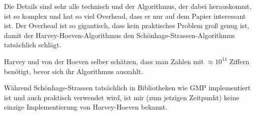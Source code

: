 \begin{remark}
    Die Details sind sehr alle technisch und der Algorithmus, der dabei herauskommt, ist so komplex und hat so viel Overhead, dass er nur auf dem Papier interessant ist. Der Overhead ist so gigantisch, dass kein praktisches Problem groß genug ist, damit der Harvey-Hoeven-Algorithmus den Schönhage-Strassen-Algorithmus tatsächlich schlägt.

    \smallskip
    Harvey und von der Hoeven selber schätzen, dass man Zahlen mit $\approx 10^{14}$ Ziffern benötigt, bevor sich ihr Algorithmus auszahlt.

    \medskip
    Während Schönhage-Strassen tatsächlich in Bibliotheken wie GMP implementiert ist und auch praktisch verwendet wird, ist mir (zum jetzigen Zeitpunkt) keine einzige Implementierung von Harvey-Hoeven bekannt.
\end{remark}